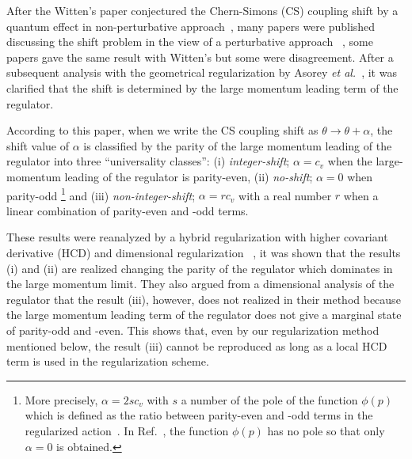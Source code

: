 \documentclass[a4paper,12pt]{article}
\begin{document}
\renewcommand{\thefootnote}{\fnsymbol{footnote}}

\label{sec:introduction}

After the Witten's paper
conjectured the Chern-Simons (CS) coupling shift
by a quantum effect in non-perturbative approach~\cite{Witten:1989hf},
many papers were published discussing the shift problem
in the view of a perturbative approach%
~\cite{Alvarez-Gaume:1990wk,Korchemsky:1990va,Martin:1990xv,Asorey:1990rn,
       Birmingham:1990ut,Giavarini:1993xb},
some papers gave the same result with Witten's but some were disagreement.
%
After a subsequent analysis with the geometrical regularization
by Asorey \textit{et al.}~\cite{Asorey:1994em},
it was clarified that
the shift is determined by the large momentum leading term of the regulator.

According to this paper, %
when we write the CS coupling shift as
$\theta\rightarrow\theta + \alpha$,
the shift value of $\alpha$ is classified
by the parity of the large momentum leading of the regulator
into three ``universality classes'':
%
(i) \textit{integer-shift}; $\alpha = c_v$ when the large-momentum leading of the regulator is parity-even,
(ii) \textit{no-shift}; $\alpha = 0$ when parity-odd%
\footnote{More precisely, $\alpha = 2sc_v$
          with $s$ a number of the pole of the function $\phi (p)$
          which is defined as the ratio between parity-even
          and -odd terms in the regularized action~\cite{Asorey:1994em}.
          In Ref.~\cite{Nittoh:1998ey},
          the function $\phi (p)$ has no pole
          so that only $\alpha = 0$ is obtained.
          }
and
(iii) \textit{non-integer-shift}; $\alpha = r c_v$ with a real number $r$
when a linear combination of parity-even and -odd terms.


These results were reanalyzed by a hybrid regularization with
higher covariant derivative (HCD) and dimensional regularization%
~\cite{Giavarini:1994zh},
it was shown that the results (i) and (ii) are realized
changing the parity of the regulator
which dominates in the large momentum limit.
%
They also argued from a dimensional analysis of the regulator
that the result (iii), however, does not realized in their method
because the large momentum leading term of the regulator
does not give a marginal state of parity-odd and -even.
%
This shows that,
even by our regularization method mentioned below,
the result (iii) cannot be reproduced 
as long as a local HCD term is used in the regularization scheme.
\end{document}
